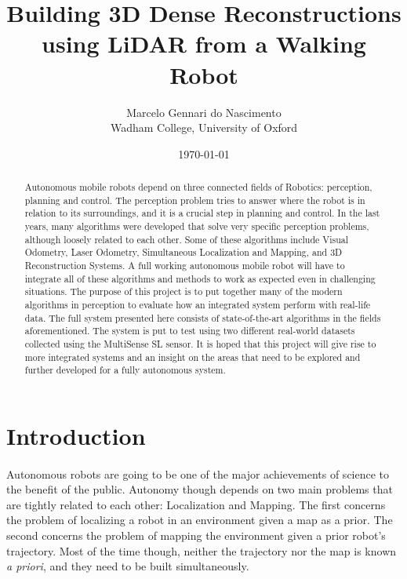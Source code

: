 \documentclass[12pt]{article}
\title{Building 3D Dense Reconstructions using LiDAR from a Walking Robot}
\author{Marcelo Gennari do Nascimento \\ Wadham College, University of Oxford}
\date{\today}
\begin{document}

	\maketitle

	\newpage

	\begin{abstract}
		Autonomous mobile robots depend on three connected fields of Robotics: perception, planning and control. The perception problem tries to answer where the robot is in relation to its surroundings, and it is a crucial step in planning and control.
		In the last years, many algorithms were developed that solve very specific perception problems, although loosely related to each other. Some of these algorithms include Visual Odometry, Laser Odometry, Simultaneous Localization and Mapping, and 3D Reconstruction Systems.
		A full working autonomous mobile robot will have to integrate all of these algorithms and methods to work as expected even in challenging situations.
		The purpose of this project is to put together many of the modern algorithms in perception to evaluate how an integrated system perform with real-life data. The full system presented here consists of state-of-the-art algorithms in the fields aforementioned. The system is put to test using two different real-world datasets collected using the MultiSense SL sensor.
		It is hoped that this project will give rise to more integrated systems and an insight on the areas that need to be explored and further developed for a fully autonomous system.
	\end{abstract}

	\newpage
	\tableofcontents

	\newpage
	\section{Introduction}
	\paragraph{}
	Autonomous robots are going to be one of the major achievements of science to the benefit of the public. Autonomy though depends on two main problems that are tightly related to each other: Localization and Mapping. The first concerns the problem of localizing a robot in an environment given a map as a prior. The second concerns the problem of mapping the environment given a prior robot's trajectory. Most of the time though, neither the trajectory nor the map is known \textit{a priori}, and they need to be built simultaneously.
	
\end{document}

